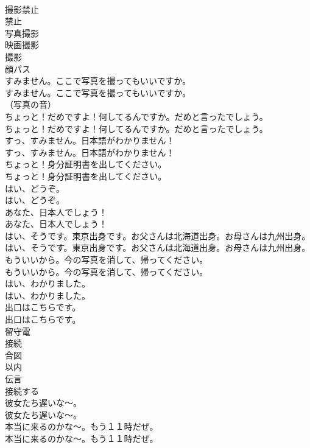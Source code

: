 \documentclass[8pt]{extreport}
\begin{document}
\begin{CJK}{UTF8}{min}
\\	撮影禁止
\\	禁止
\\	写真撮影
\\	映画撮影
\\	撮影
\\	顔パス
\\	すみません。ここで写真を撮ってもいいですか。	
\\	すみません。ここで写真を撮ってもいいですか。 
\\	（写真の音）	
\\	ちょっと！だめですよ！何してるんですか。だめと言ったでしょう。	
\\	ちょっと！だめですよ！何してるんですか。だめと言ったでしょう。 
\\	すっ、すみません。日本語がわかりません！	
\\	すっ、すみません。日本語がわかりません！ 
\\	ちょっと！身分証明書を出してください。	
\\	ちょっと！身分証明書を出してください。 
\\	はい、どうぞ。	
\\	はい、どうぞ。 
\\	あなた、日本人でしょう！	
\\	あなた、日本人でしょう！ 
\\	はい、そうです。東京出身です。お父さんは北海道出身。お母さんは九州出身。	
\\	はい、そうです。東京出身です。お父さんは北海道出身。お母さんは九州出身。 
\\	もういいから。今の写真を消して、帰ってください。	
\\	もういいから。今の写真を消して、帰ってください。 
\\	はい、わかりました。	
\\	はい、わかりました。 
\\	出口はこちらです。	
\\	出口はこちらです。 
\\	留守電
\\	接続
\\	合図
\\	以内
\\	伝言
\\	接続する
\\	彼女たち遅いな〜。	
\\	彼女たち遅いな〜。 
\\	本当に来るのかな〜。もう１１時だぜ。	
\\	本当に来るのかな〜。もう１１時だぜ。 

\end{CJK}
\end{document}
